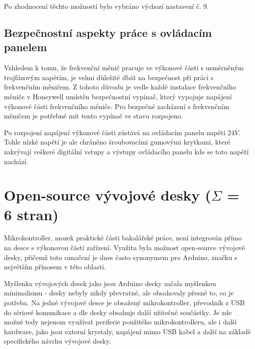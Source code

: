 Po zhodnocení těchto možností bylo vybráno výchozí nastavení č. 9.

\subsection{Bezpečnostní aspekty práce s ovládacím panelem}

Vzhledem k tomu, že frekvenční měnič pracuje ve výkonové části s usměrněným trojfázovým napětím, je velmi důležité dbát na bezpečnost při práci s frekvenčním měničem. Z tohoto důvodu je vedle každé instalace frekvenčního měniče v Honeywell umístěn bezpečnostní vypínač, který vypojuje napájení výkonové části frekvenčního měniče. Pro bezpečné zacházení s frekvenčním měničem je potřebné mít tento vypínač ve stavu rozpojeno.

Po rozpojení napájení výkonové části zůstává na ovládacím panelu napětí $24V$. Tohle nízké napětí je ale chráněno šroubovacími gumovými krytkami, které zakrývají veškeré digitální vstupy a výstupy ovládacího panelu kde se toto napětí nachází.

\section{Open-source vývojové desky ($\Sigma$ = 6 stran)}

Mikrokontroller, mozek praktické části bakalářské práce, není integrován přímo na desce s výkonovou částí zařízení. Využita byla možnost open-source vývojové desky, přičemž toto označení je dnes často synonymem pro Arduino, značku s největším přínosem v této oblasti.

Myšlenka vývojových desek jako jsou Arduino desky začala myšlenkou minimalismu - desky nebyly nikdy převratné, ale obsahovaly přesně to, co je potřeba. Na jedné vývojové desce je obsažený mikrokontroller, převodník z USB do sériové komunikace a dle desky obsahuje další užitečné součástky. Je zde možné tedy nejenom využívat periferie použitého mikrokontrolleru, ale i další hardware, jako jsou externí krystaly, napájení mimo USB kabel a další na základě specifického návrhu vývojové desky.
\cite{KnihaOArduinu}

